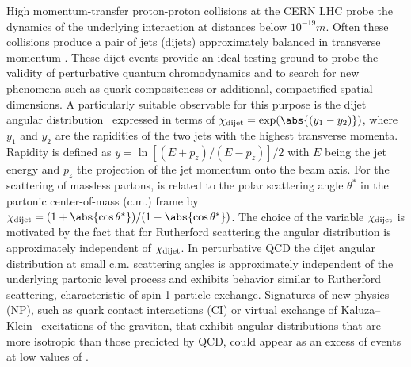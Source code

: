 \documentclass[11pt,twoside,a4paper,cmspaper,final,collab]{cms-tdr}
\begin{document}
High momentum-transfer proton-proton collisions at the CERN LHC
probe the dynamics of the underlying interaction at distances below
$10^{-19}\unit{m}$. Often these collisions produce a pair of jets (dijets) approximately
balanced in transverse momentum \pt. These
dijet events provide an ideal testing ground to probe the validity of perturbative
quantum chromodynamics and to search for new phenomena such as
quark compositeness or additional,
compactified spatial dimensions. A particularly suitable observable
for this purpose is the dijet angular distribution~\cite{UA1} expressed
in terms of $\chijj = \exp(\abs{(y_1 -y_2)})$, where $y_1$ and $y_2$ are the
rapidities of the two jets with the highest transverse momenta.
Rapidity is defined as $y = \ln\left[\left(E + p_z\right) / \left(E -
    p_z\right)\right]/2$ with $E$ being the jet energy and $p_z$ the
projection of the jet momentum onto the beam axis.
For the scattering of massless partons, \chijj is related to the polar scattering angle $\theta^{*}$ in the partonic center-of-mass (c.m.) frame by
$\chijj = (1 + \abs{\cos{\theta^*}}) / ( 1 - \abs{\cos{\theta^*}})$.
The choice of the variable $\chi_\text{dijet}$ is motivated by the fact that for
Rutherford scattering the angular distribution is approximately independent of
$\chi_\text{dijet}$.
In perturbative QCD the dijet angular distribution at small c.m. scattering angles
is approximately independent of the underlying partonic level process
and exhibits
behavior similar to Rutherford scattering, characteristic of spin-1 particle
exchange.
Signatures of new
physics (NP), such as quark contact interactions (CI) or virtual
exchange of Kaluza--Klein~\cite{Klein} excitations of the graviton,
that exhibit angular distributions that are more isotropic than those
predicted by QCD, could appear as an excess of events at low values of \chijj.
\end{document}
